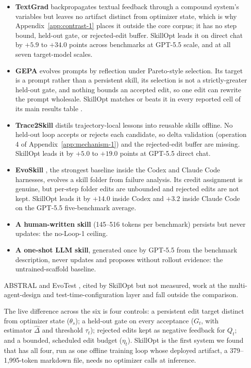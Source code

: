 \documentclass[
  11pt,
]{article}
\providecommand{\tightlist}{%
  \setlength{\itemsep}{0pt}\setlength{\parskip}{0pt}}
\begin{document}
\begin{itemize}
\tightlist
\item
  \textbf{TextGrad} \cite{yuksekgonul2024textgrad} backpropagates textual feedback through a compound system's variables but leaves no artifact distinct from optimizer state, which is why Appendix~\ref{app:contrast-1} places it outside the core corpus; it has no step bound, held-out gate, or rejected-edit buffer. SkillOpt leads it on direct chat by \(+5.9\) to \(+34.0\) points across benchmarks at GPT-5.5 scale, and at all seven target-model scales.
\item
  \textbf{GEPA} \cite{agrawal2025gepa} evolves prompts by reflection under Pareto-style selection. Its target is a prompt rather than a persistent skill, its selection is not a strictly-greater held-out gate, and nothing bounds an accepted edit, so one edit can rewrite the prompt wholesale. SkillOpt matches or beats it in every reported cell of its main results table \cite{yang2026skillopt}.
\item
  \textbf{Trace2Skill} \cite{ni2026trace2skill} distils trajectory-local lessons into reusable skills offline. No held-out loop accepts or rejects each candidate, so delta validation (operation 4 of Appendix~\ref{app:mechanism-1}) and the rejected-edit buffer are missing. SkillOpt leads it by \(+5.0\) to \(+19.0\) points at GPT-5.5 direct chat.
\item
  \textbf{EvoSkill} \cite{alzubi2026evoskill}, the strongest baseline inside the Codex and Claude Code harnesses, evolves a skill folder from failure analysis. Its credit assignment is genuine, but per-step folder edits are unbounded and rejected edits are not kept. SkillOpt leads it by \(+14.0\) inside Codex and \(+3.2\) inside Claude Code on the GPT-5.5 five-benchmark average.
\item
  \textbf{A human-written skill} (145--516 tokens per benchmark) persists but never updates: the no-Loop-1 ceiling.
\item
  \textbf{A one-shot LLM skill}, generated once by GPT-5.5 from the benchmark description, never updates and proposes without rollout evidence: the untrained-scaffold baseline.
\end{itemize}

ABSTRAL \cite{song2026abstral} and EvoTest \cite{he2025evotest}, cited by SkillOpt but not measured, work at the multi-agent-design and test-time-configuration layer and fall outside the comparison.

The live difference across the six is four controls: a persistent edit target distinct from optimizer state (\(\theta_s\)); a held-out gate on every acceptance (\(G_t\), with estimator \(\widehat\Delta\) and threshold \(\tau_t\)); rejected edits kept as negative feedback for \(Q_t\); and a bounded, scheduled edit budget (\(\eta_t\)). SkillOpt is the first system we found that has all four, run as one offline training loop whose deployed artifact, a 379--1,995-token markdown file, needs no optimizer calls at inference.
\end{document}
